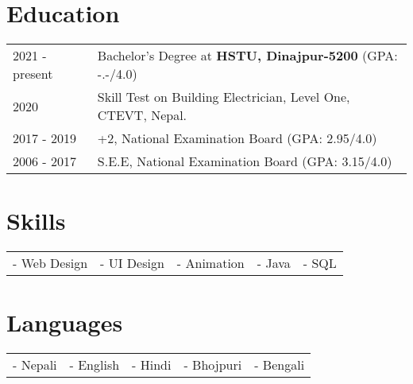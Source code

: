 \documentclass[a4paper,12pt]{article}
\begin{document}
\section{Education}
\begin{tabularx}{\linewidth}{@{}l X@{}}	
2021 - present & Bachelor's Degree at \textbf{HSTU, Dinajpur-5200} \hfill \normalsize (GPA: -.-/4.0) \\

2020 & Skill Test on Building Electrician, Level One, CTEVT, Nepal.  \\ 

2017 - 2019 & +2, National Examination Board \hfill  (GPA: 2.95/4.0) \\

2006 - 2017 & S.E.E, National Examination Board \hfill  (GPA: 3.15/4.0) \\
\end{tabularx}

\section{Skills}
\begin{tabularx}{\linewidth}{@{}l l l l l@{}}
- Web Design &  - UI Design &  - Animation  &  - Java  &  - SQL\\  
\end{tabularx}

\section{Languages}
\begin{tabularx}{\linewidth}{@{}l l l l l@{}}
- Nepali &  - English &  - Hindi  &  - Bhojpuri  &  - Bengali\\  
\end{tabularx}
\end{document}
